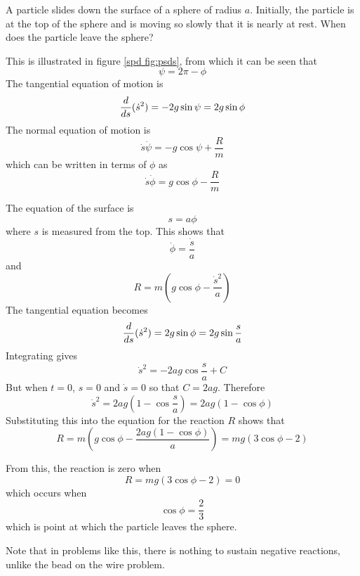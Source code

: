 \begin{example}
\label{spd exam:psds}

\problem 
A particle slides down the surface of a sphere of radius $a$.  Initially,
the particle is at the top of the sphere and is moving so slowly that it is
nearly at rest.  When does the particle leave the sphere?

\solution
This is illustrated in figure \ref{spd fig:psds}, from which it can be 
seen that
$$\psi=2\pi-\phi$$
The tangential equation of motion is 
$$\frac{d}{d{s}}(\dot{s}^2)=-2g\sin\psi=2g\sin\phi$$
The normal equation of motion is
$$\dot{s}\dot{\psi}=-g\cos\psi+\frac{R}{m}$$
which can be written in terms of $\phi$ as
$$\dot{s}\dot{\phi}=g\cos\phi-\frac{R}{m}$$

The equation of the surface is
$$s=a\phi$$
where $s$ is measured from the top.  This shows that
$$\dot{\phi}=\frac{\dot{s}}{a}$$
and 
$$R=m\left(g\cos\phi-\frac{\dot{s}^2}{a}\right)$$
The tangential equation becomes
$$\frac{d}{d{s}}(\dot{s}^2)=2g\sin\phi=2g\sin\frac{s}{a}$$
Integrating gives
$$\dot{s}^2=-2ag\cos\frac{s}{a}+C$$
But when $t=0$, $s=0$ and $\dot{s}=0$ so that $C=2ag$.  Therefore
$$\dot{s}^2=2ag\left(1-\cos\frac{s}{a}\right)=2ag\left(1-\cos\phi\right)$$
Substituting this into the equation for the reaction $R$ shows that
$$R=m\left(g\cos\phi-\frac{2ag(1-\cos\phi)}{a}\right)=mg(3\cos\phi-2)$$

From this, the reaction is zero when 
$$R=mg(3\cos\phi-2)=0$$
which occurs when
$$\cos\phi=\frac{2}{3}$$
which is point at which the particle leaves the sphere.

Note that in problems like this, there is nothing to sustain negative
reactions, unlike the bead on the wire problem.
\end{example}

